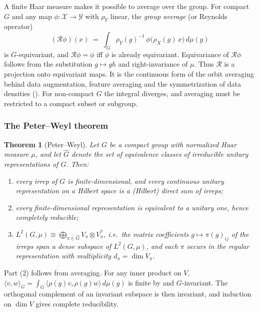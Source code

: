 \documentclass[11pt]{article}
\theoremstyle{plain}
\newtheorem{Theorem}{Theorem}[section]
\theoremstyle{definition}
\begin{document}
A finite Haar measure makes it possible to average over the group.
For compact $G$ and any map $\phi:\mathcal{X}\to\mathcal{Y}$ with $\rho_Y$ linear, the \emph{group average} (or Reynolds operator)
\[
    (\mathcal{R}\phi)(x) \;=\; \int_G \rho_Y(g)^{-1}\,\phi\bigl(\rho_X(g)\,x\bigr)\,d\mu(g)
\]
is $G$-equivariant, and $\mathcal{R}\phi = \phi$ iff $\phi$ is already equivariant.
Equivariance of $\mathcal{R}\phi$ follows from the substitution $g\mapsto gh$ and right-invariance of $\mu$.
Thus $\mathcal{R}$ is a projection onto equivariant maps.
It is the continuous form of the orbit averaging behind data augmentation, feature averaging and the symmetrization of data densities ().
For non-compact $G$ the integral diverges, and averaging must be restricted to a compact subset or subgroup.

\subsubsection{The Peter--Weyl theorem}
\label{subsubsec:peter-weyl}

\begin{Theorem}[Peter--Weyl]\label{thm:peter-weyl}
Let $G$ be a compact group with normalized Haar measure $\mu$, and let $\widehat{G}$ denote the set of equivalence classes of irreducible unitary representations of $G$. Then:
\begin{enumerate}
    \item every irrep of $G$ is finite-dimensional, and every continuous unitary representation on a Hilbert space is a (Hilbert) direct sum of irreps;
    \item every finite-dimensional representation is equivalent to a unitary one, hence completely reducible;
    \item $L^2(G,\mu)\cong\bigoplus_{\pi\in\widehat{G}}V_\pi\otimes V_\pi^*$, i.e.\ the matrix coefficients $g\mapsto\pi(g)_{ij}$ of the irreps span a dense subspace of $L^2(G,\mu)$, and each $\pi$ occurs in the regular representation with multiplicity $d_\pi = \dim V_\pi$.
\end{enumerate}
\end{Theorem}

Part (2) follows from averaging.
For any inner product on $V$, $\langle v,w\rangle_G = \int_G\langle\rho(g)v,\rho(g)w\rangle\,d\mu(g)$ is finite by  and $G$-invariant.
The orthogonal complement of an invariant subspace is then invariant, and induction on $\dim V$ gives complete reducibility.
\end{document}

